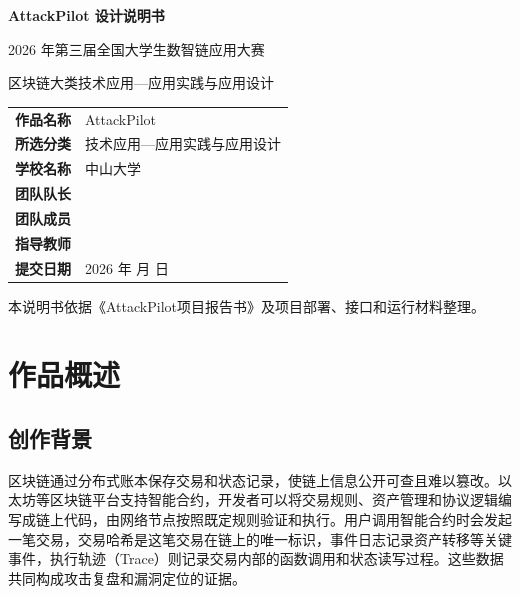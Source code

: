\documentclass[UTF8,a4paper,12pt]{ctexart}
\renewcommand{\arraystretch}{1.35}
\begin{document}
\begin{titlepage}
  \thispagestyle{empty}
  \vspace*{22mm}
  \begin{center}
    {\bfseries\color{AttackBlue} AttackPilot 设计说明书\par}
    \vspace{8mm}
    {\color{AttackGray}2026 年第三届全国大学生数智链应用大赛\par}
    \vspace{3mm}
    {\color{AttackGray}区块链大类\quad 技术应用—应用实践与应用设计\par}
    \vspace{20mm}
    \renewcommand{\arraystretch}{1.7}
    \begin{tabularx}{0.84\textwidth}{>{\bfseries}p{}X}
      \toprule
      作品名称 & AttackPilot \\
      所选分类 & 技术应用—应用实践与应用设计 \\
      学校名称 & 中山大学 \\
      团队队长 & \underline{\hspace{55mm}} \\
      团队成员 & \underline{\hspace{55mm}} \\
      指导教师 & \underline{\hspace{55mm}} \\
      提交日期 & 2026 年 \underline{\hspace{12mm}} 月 \underline{\hspace{12mm}} 日 \\
      \bottomrule
    \end{tabularx}
    \vfill
    {\small 本说明书依据《AttackPilot项目报告书》及项目部署、接口和运行材料整理。\par}
  \end{center}
\end{titlepage}

\tableofcontents
\clearpage

\section{作品概述}

\subsection{创作背景}

区块链通过分布式账本保存交易和状态记录，使链上信息公开可查且难以篡改。以太坊等区块链平台支持智能合约，开发者可以将交易规则、资产管理和协议逻辑编写成链上代码，由网络节点按照既定规则验证和执行。用户调用智能合约时会发起一笔交易，交易哈希是这笔交易在链上的唯一标识，事件日志记录资产转移等关键事件，执行轨迹（Trace）则记录交易内部的函数调用和状态读写过程。这些数据共同构成攻击复盘和漏洞定位的证据。\par
\end{document}
